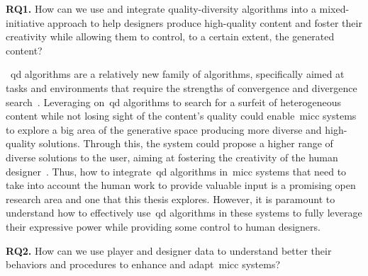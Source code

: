 \begin{retQuestion}{}
   \textbf{RQ1.} How can we use and integrate quality-diversity algorithms into a mixed-initiative approach to help designers produce high-quality content and foster their creativity while allowing them to control, to a certain extent, the generated content?
\end{retQuestion}

~\acrfull{qd} algorithms are a relatively new family of algorithms, specifically aimed at tasks and environments that require the strengths of convergence and divergence search~\cite{Pugh2016}. Leveraging on~\acrshort{qd} algorithms to search for a surfeit of heterogeneous content while not losing sight of the content's quality could enable~\acrshort{micc} systems to explore a big area of the generative space producing more diverse and high-quality solutions. Through this, the system could propose a higher range of diverse solutions to the user, aiming at fostering the creativity of the human designer~\cite{Liapis2016-CanComputersFosterCreativity}. Thus, how to integrate~\acrshort{qd} algorithms in~\acrshort{micc} systems that need to take into account the human work to provide valuable input is a promising open research area and one that this thesis explores. However, it is paramount to understand how to effectively use~\acrshort{qd} algorithms in these systems to fully leverage their expressive power while providing some control to human designers. 

\begin{retQuestion}{}
   \textbf{RQ2.} How can we use player and designer data to understand better their behaviors and procedures to enhance and adapt~\acrlong{micc} systems?
   
   
   
   
\end{retQuestion}

